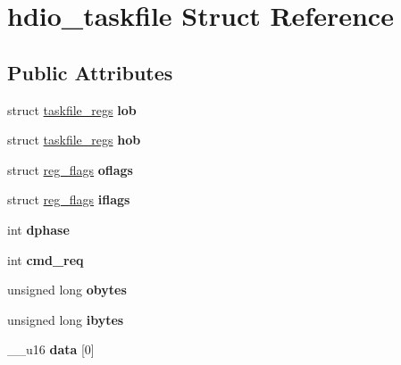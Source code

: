 \hypertarget{structhdio__taskfile}{}\section{hdio\+\_\+taskfile Struct Reference}
\label{structhdio__taskfile}
\subsection*{Public Attributes}
\begin{DoxyCompactItemize}
\item 
\hypertarget{structhdio__taskfile_a55b07a367829617c8ebe0769b76bbc0e}{}struct \hyperlink{structtaskfile__regs}{taskfile\+\_\+regs} {\bfseries lob}\label{structhdio__taskfile_a55b07a367829617c8ebe0769b76bbc0e}

\item 
\hypertarget{structhdio__taskfile_ae161f5c3638bc3475649274b897988e1}{}struct \hyperlink{structtaskfile__regs}{taskfile\+\_\+regs} {\bfseries hob}\label{structhdio__taskfile_ae161f5c3638bc3475649274b897988e1}

\item 
\hypertarget{structhdio__taskfile_a8087c29be88ec1985887f13a90419afc}{}struct \hyperlink{structreg__flags}{reg\+\_\+flags} {\bfseries oflags}\label{structhdio__taskfile_a8087c29be88ec1985887f13a90419afc}

\item 
\hypertarget{structhdio__taskfile_ae9ad89372a4b8c151eb90a7c36d8eb9b}{}struct \hyperlink{structreg__flags}{reg\+\_\+flags} {\bfseries iflags}\label{structhdio__taskfile_ae9ad89372a4b8c151eb90a7c36d8eb9b}

\item 
\hypertarget{structhdio__taskfile_abbea20cd0df9245dfb9ff41e5e7a0b0c}{}int {\bfseries dphase}\label{structhdio__taskfile_abbea20cd0df9245dfb9ff41e5e7a0b0c}

\item 
\hypertarget{structhdio__taskfile_a1fb169e9418340d6fc68676daa742803}{}int {\bfseries cmd\+\_\+req}\label{structhdio__taskfile_a1fb169e9418340d6fc68676daa742803}

\item 
\hypertarget{structhdio__taskfile_a81850ad13dc8c73990eba46ff62c944c}{}unsigned long {\bfseries obytes}\label{structhdio__taskfile_a81850ad13dc8c73990eba46ff62c944c}

\item 
\hypertarget{structhdio__taskfile_a98b5d0b77c7bcdf13f7858308244bc28}{}unsigned long {\bfseries ibytes}\label{structhdio__taskfile_a98b5d0b77c7bcdf13f7858308244bc28}

\item 
\hypertarget{structhdio__taskfile_aee91033185d4fe0fbb46e1cfb233d096}{}\+\_\+\+\_\+u16 {\bfseries data} \mbox{[}0\mbox{]}\label{structhdio__taskfile_aee91033185d4fe0fbb46e1cfb233d096}

\end{DoxyCompactItemize}


